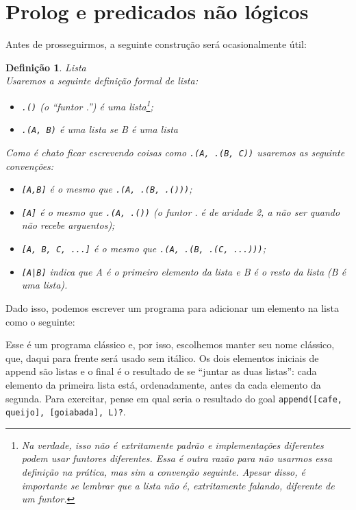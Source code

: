 \documentclass{article}
\newtheorem{definition}{Definição}[section]
\theoremstyle{remark}
\begin{document}
\section{Prolog e predicados não lógicos}

Antes de prosseguirmos, a seguinte construção será ocasionalmente útil:

\begin{definition}{Lista}
  \\ Usaremos a seguinte definição formal de lista:
  \begin{itemize}
    \item {\tt .()} (o ``funtor .'') é uma lista\footnote{Na verdade, isso não é extritamente padrão e implementações diferentes podem usar funtores diferentes. Essa é outra razão para não usarmos essa definição na prática, mas sim a convenção seguinte. Apesar disso, é importante se lembrar que a lista não é, extritamente falando, diferente de um funtor.};
    \item {\tt .(A, B)} é uma lista se B é uma lista
  \end{itemize}
  Como é chato ficar escrevendo coisas como {\tt.(A, .(B, C))} usaremos as seguinte convenções:
  \begin{itemize}
    \item {\tt [A,B]} é o mesmo que {\tt .(A, .(B, .()))};
    \item {\tt [A]} é o mesmo que {\tt .(A, .())} (o funtor . é de aridade 2, a não ser quando não recebe arguentos);
    \item {\tt [A, B, C, ...]} é o mesmo que {\tt .(A, .(B, .(C, ...)))};
    \item {\tt [A|B]} indica que A é o primeiro elemento da lista e B é o resto da lista (B é uma lista).
  \end{itemize}
\end{definition}

Dado isso, podemos escrever um programa para adicionar um elemento na lista como o seguinte:



Esse é um programa clássico e, por isso, escolhemos manter seu nome clássico, que, daqui para frente será usado sem itálico. Os dois elementos iniciais de append são listas e o final é o resultado de se ``juntar as duas listas'': cada elemento da primeira lista está, ordenadamente, antes da cada elemento da segunda. Para exercitar, pense em qual seria o resultado do goal {\tt append([cafe, queijo], [goiabada], L)?}.
\end{document}
